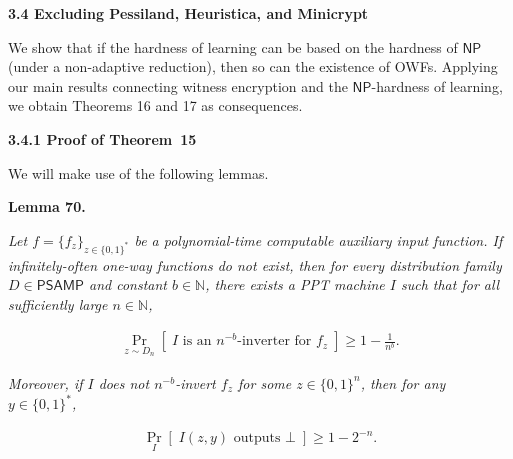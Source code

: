 \par\medskip\noindent\textbf{
3.4 Excluding Pessiland, Heuristica, and Minicrypt}\par




We show that if the hardness of learning can be based on the hardness of ${\mathsf{NP}}$ (under a non-adaptive reduction), then so can the existence of OWFs. Applying our main results connecting witness encryption and the ${\mathsf{NP}}$-hardness of learning, we obtain Theorems 16 and 17 as consequences.\par




\par\medskip\noindent\textbf{
3.4.1 Proof of Theorem 15
}\par




We will make use of the following lemmas.\par





\par\medskip\noindent\textbf{
\textbf{Lemma 70}\textbf{.}
}\par



\emph{Let $f=\{f_{z}\}_{z\in\{0,1\}^{*}}$ be a polynomial-time computable auxiliary input function. If infinitely-often one-way functions do not exist, then for every distribution family $D\in{\mathsf{P}}{\mathsf{SAMP}}$ and constant $b\in\mathbb{N}$, there exists a PPT machine $I$ such that for all sufficiently large $n\in\mathbb{N}$,}\par


\[\begin{gathered}
\Pr_{z\sim D_{n}}[\;I\text{ is an }n^{-b}\text{-inverter for }f_{z}\;]\geq 1-\frac{1}{n^{b}}.
\end{gathered}\]


\emph{Moreover, if $I$ does not $n^{-b}$-invert $f_{z}$ for some $z\in\{0,1\}^{n}$, then for any $y\in\{0,1\}^{*}$,}\par


\[\begin{gathered}
\Pr_{I}[\;I(z,y)\text{ outputs }\bot\;]\geq 1-2^{-n}.
\end{gathered}\]






